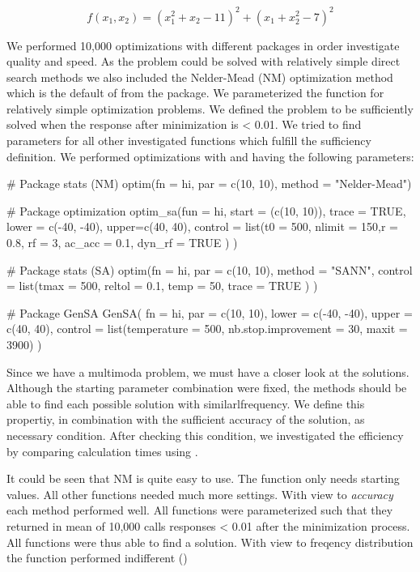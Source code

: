 \begin{equation}
f(x_1,x_2)=(x_1^2+x_2-11)^2+(x_1+x_2^2-7)^2
\end{equation}

We performed 10,000 optimizations with different packages in order investigate quality and speed. As the problem could be solved with relatively simple direct search methods we also included the Nelder-Mead (NM) optimization method \citep{nelder_1965} which is the default of  from the  package. We parameterized the  function for relatively simple optimization problems. We defined the problem to be sufficiently solved when the response after minimization is < 0.01. We tried to find parameters for all other investigated functions which fulfill the sufficiency definition. We performed optimizations with  and  having the following parameters:

\begin{example}
# Package stats (NM)
optim(fn = hi, par = c(10, 10), method = "Nelder-Mead")

# Package optimization
optim_sa(fun = hi, start = (c(10, 10)), trace = TRUE, 
	lower = c(-40, -40), upper=c(40, 40),
		control = list(t0 = 500, nlimit = 150,r = 0.8,
		rf = 3, ac_acc = 0.1, dyn_rf = TRUE
		)
	)

# Package stats (SA)
optim(fn = hi, par = c(10, 10), method = "SANN",
	control = list(tmax = 500, reltol = 0.1, temp = 50, trace = TRUE
		)
	)

# Package GenSA
GenSA( fn = hi, par = c(10, 10), lower = c(-40, -40), upper = c(40, 40), 
	control = list(temperature = 500, nb.stop.improvement = 30, maxit = 3900)
	)
\end{example}
Since we have a multimoda problem, we must have a closer look at the solutions. Although the starting parameter combination were fixed, the methods should be able to find each possible solution with similarlfrequency. We define this propertiy, in combination with the sufficient accuracy of the solution, as necessary condition. After checking this condition, we investigated the efficiency by comparing calculation times using .

It could be seen that NM is quite easy to use. The function only needs starting values. All other functions needed much more settings. With view to \textit{accuracy} each method performed well. All functions were parameterized such that they returned in mean of 10,000 calls responses < 0.01 after the minimization process. All functions were thus able to find a solution. With view to freqency distribution the function performed indifferent ()




